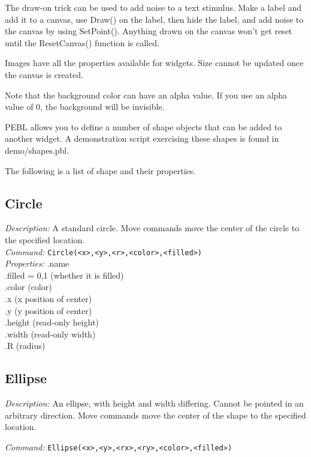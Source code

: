 The draw-on trick can be used to add noise to a text stimulus.  Make
a label and add it to a canvas, use Draw() on the label, then hide the
label, and add noise to the canvas by using SetPoint().
Anything drawn on the canvas won't get reset until the ResetCanvas()
function is called.

Images have all the properties available for widgets.  Size cannot be
updated once the canvas is created.

Note that the background color can have an alpha value.  If you use an
alpha value of 0, the background will be invisible.


PEBL allows you to define a number of shape objects that can be added
to another widget.  A demonstration script exercising these shapes is found in demo/shapes.pbl.

The following is a list of shape and their properties.

\subsection{Circle}
\emph{Description:} A standard circle.  Move commands move the center
  of the circle to the specified location.\\

\emph{Command:}  \verb+Circle(<x>,<y>,<r>,<color>,<filled>)+\\

\emph{Properties:}
.name\\
.filled = {0,1} (whether it is filled)\\
.color (color) \\
.x  (x position of center) \\
.y  (y position of center)\\
.height (read-only height)\\
.width (read-only width)\\
.R  (radius)\\

\subsection{Ellipse}

\emph{Description:} An ellipse, with height and width differing.
  Cannot be pointed in an arbitrary direction.  Move commands move the center
  of the shape to the specified location.

\emph{Command:}  \verb+Ellipse(<x>,<y>,<rx>,<ry>,<color>,<filled>)+\\

